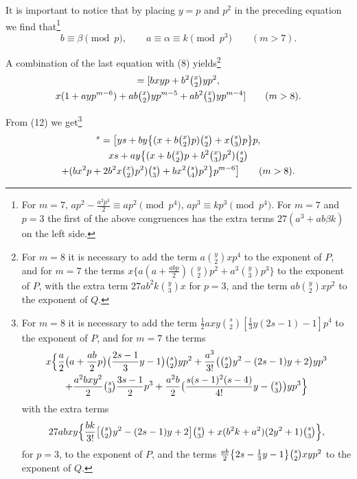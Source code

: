 \documentclass[oneside]{article}
\begin{document}
It is important to notice that by placing $y = p$ and $p^2$ in the
preceding equation we find that\footnote{For $m = 7,\,
ap^2-\frac{a^2p^3}{2} \equiv ap^2 \pmod{p^4},\, ap^3 \equiv kp^3
\pmod{p^4}$. For $m = 7$ and $p = 3$ the first of the above
congruences has the extra terms $27(a^3 + ab\beta k)$ on the left
side.}
\begin{equation*}
b \equiv \beta \pmod{p}, \qquad a \equiv \alpha \equiv k \pmod{p^3}
  \qquad (m > 7).
\end{equation*}

A combination of the last equation with (8) yields\footnote{For $m
= 8$ it is necessary to add the term $a\binom{y}{2}xp^4$ to the
exponent of $P$, and for $m = 7$ the terms $x\{a(a +
\frac{abp}{2})\binom{y}{2}p^2 + a^3\binom{y}{3}p^3\}$ to the
exponent of $P$, with the extra term $27ab^2 k\binom{y}{3}x$ for
$p = 3$, and the term $ab\binom{y}{2}xp^2$ to the exponent of
$Q$.}
\begin{multline}
[-y,\, x,\, y] = [bxyp + b^2\tbinom{x}{2}yp^2, \\
  x(1 + ayp^{m-6}) + ab\tbinom{x}{2}yp^{m-5} +
  ab^2\tbinom{x}{3}yp^{m-4}] \qquad (m > 8). %
\end{multline}

\newpage
From (12) we get\footnote{For $m = 8$ it is necessary to add the
term $\frac{1}{2} axy \binom{s}{2}[\frac{1}{3}y(2s - 1) - 1]p^4$
to the exponent of $P$, and for $m=7$ the terms
\begin{multline*}
  x \Bigl\{ \frac{a}{2} \bigl( a + \frac{ab}{2} p \bigr)
    \bigl(\frac{2s-1}{3} y - 1 \bigr) \tbinom{s}{2}yp^2 +
    \frac{a^{3}}{3!} \bigl(\tbinom{s}{2}y^2 - (2s - 1)y + 2 \bigr) yp^3 \\
  + \frac{a^2 bxy^2}{2} \tbinom{s}{3} \frac{3s-1}{2}p^3 + \frac{a^2 b}{2}
    \bigl( \frac{s(s - 1)^2 (s - 4)}{4!}y - \tbinom{s}{3} \bigr) yp^3 \Bigr\}
\end{multline*}
\noindent with the extra terms
\begin{equation*}
  27abxy \Bigl\{ \frac{bk}{3!}\bigl[\tbinom{s}{2}y^2 - (2s - 1)y + 2\bigr] \tbinom{s}{3}
    + x(b^2 k + a^2)(2y^2 + 1)\tbinom{s}{3} \Bigr\},
\end{equation*}
\noindent for $p=3$, to the exponent of $P$, and the terms
$\frac{ab}{2} \bigl\{ 2s - \frac{1}{3}y - 1 \bigr\} \tbinom{s}{2}xyp^2$
to the exponent of $Q$.} %
\begin{multline}
[y,\, x]^s = \bigl[ys + by\bigl\{(x +b\tbinom{x}{2}p)\tbinom{s}{2} + x\tbinom{s}{3}p\bigr\}p, \\
  xs + ay\bigl\{(x+b\tbinom{x}{2}p + b^2\tbinom{x}{3}p^2)\tbinom{s}{2} \\
  + (bx^2 p + 2b^2 x\tbinom{x}{2}p^2)\tbinom{s}{3} + bx^2\tbinom{s}{4}p^2\bigr\}p^{m-6}\bigr]
  \qquad (m > 8). %
\end{multline}
\end{document}
